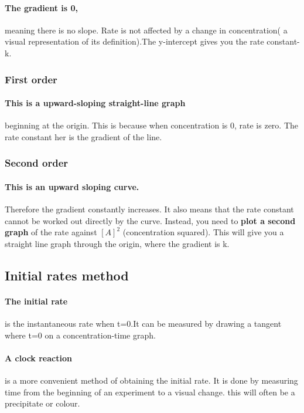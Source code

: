 \paragraph{The gradient is 0,}meaning there is no slope. Rate is not affected by a change in concentration( a visual representation of its definition).The y-intercept gives you the rate constant-k.
\subsubsection{First order}
\paragraph{This is a upward-sloping straight-line graph}beginning at the origin. This is because when concentration is 0, rate is zero. The rate constant her is the gradient of the line.
\subsubsection{Second order}
\paragraph{This is an upward sloping curve.}Therefore the gradient constantly increases. It also means that the rate constant cannot be worked out directly by the curve. Instead, you need to \textbf{plot a second graph} of the rate against $[A]^2$ (concentration squared). This will give you a straight line graph through the origin, where the gradient is k.
\subsection{Initial rates method}
\paragraph{The initial rate}is the instantaneous rate when t=0.It can be measured by drawing a tangent where t=0 on a concentration-time graph.
\paragraph{A clock reaction}is a more convenient method of obtaining the initial rate. It is done by measuring time from the beginning of an experiment to a visual change. this will often be a precipitate or colour.